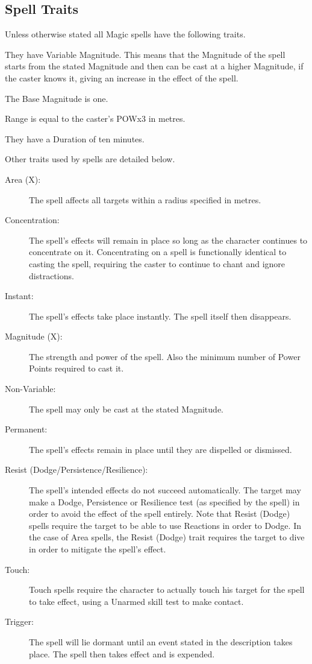 \subsection{Spell Traits}
Unless otherwise stated all Magic spells have the following traits.

\begin{rpg-list}
\item They have Variable Magnitude. This means that the Magnitude of the spell starts from the stated Magnitude and then can be cast at a higher Magnitude, if the caster knows it, giving an increase in the effect of the spell. %
\item The Base Magnitude is one. 
\item Range is equal to the caster’s POWx3 in metres.
\item They have a Duration of ten minutes.
\end{rpg-list}

Other traits used by spells are detailed below. 
\begin{description}
	\item[Area (X):] The spell affects all targets within a radius specified in metres. 
	\item[Concentration:] The spell’s effects will remain in place so long as the character continues to concentrate on it. Concentrating on a spell is functionally identical to casting the spell, requiring the caster to continue to chant and ignore distractions. 
	\item[Instant:] The spell’s effects take place instantly. The spell itself then disappears. 
	\item[Magnitude (X):] The strength and power of the spell. Also the minimum number of Power Points required to cast it. 
	\item[Non-Variable:] The spell may only be cast at the stated Magnitude.
	\item[Permanent:] The spell’s effects remain in place until they are dispelled or dismissed. 
	\item[Resist (Dodge/Persistence/Resilience):] The spell’s intended effects do not succeed automatically. The target may make a Dodge, Persistence or Resilience test (as specified by the spell) in order to avoid the effect of the spell entirely. Note that Resist (Dodge) spells require the target to be able to use Reactions in order to Dodge. In the case of Area spells, the Resist (Dodge) trait requires the target to dive in order to mitigate the spell’s effect. 
	\item[Touch:] Touch spells require the character to actually touch his target for the spell to take effect, using a Unarmed skill test to make contact. %
	\item[Trigger:] The spell will lie dormant until an event stated in the description takes place. The spell then takes effect and is expended.
\end{description}



